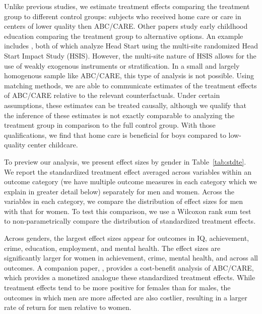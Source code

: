 Unlike previous studies, we estimate treatment effects comparing the treatment group to different control groups: subjects who received home care or care in centers of lower quality then ABC/CARE. Other papers study early childhood education comparing the treatment group to alternative options. An example includes \citet{Feller_Grindal_etal_2016_ComparedtoWhat,Kline_Walters_2016_QJE}, both of which analyze Head Start using the multi-site randomized Head Start Impact Study (HSIS). However, the multi-site nature of HSIS allows for the use of weakly exogenous instruments or stratification. In a small and largely homogenous sample like ABC/CARE, this type of analysis is not possible. Using matching methods, we are able to communicate estimates of the treatment effects of ABC/CARE relative to the relevant counterfactuals. Under certain assumptions, these estimates can be treated causally, although we qualify that the inference of these estimates is not exactly comparable to analyzing the treatment group in comparison to the full control group. With those qualifications, we find that home care is beneficial for boys compared to low-quality center childcare. 

To preview our analysis, we present effect sizes by gender in Table~\ref{tab:stdte}. We report the standardized treatment effect averaged across variables within an outcome category (we have multiple outcome measures in each category which we explain in greater detail below) separately for men and women. Across the variables in each category, we compare the distribution of effect sizes for men with that for women. To test this comparison, we use a Wilcoxon rank sum test to non-parametrically compare the distribution of standardized treatment effects.

Across genders, the largest effect sizes appear for outcomes in IQ, achievement, crime, education, employment, and mental health. The effect sizes are significantly larger for women in achievement, crime, mental health, and across all outcomes. A companion paper, \citet{Garcia_Heckman_Leaf_etal_2017_Comp_CBA_Unpublished}, provides a cost-benefit analysis of ABC/CARE, which provides a monetized analogue these standardized treatment effects. While treatment effects tend to be more positive for females than for males, the outcomes in which men are more affected are also costlier, resulting in a larger rate of return for men relative to women.

